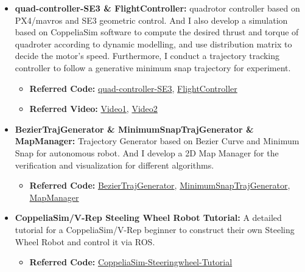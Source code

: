 \documentclass[11pt,a4paper,sans]{moderncv}        %
\begin{document}
\begin{CJK*}{UTF8}{gbsn}
{\begin{itemize}
\item \textbf{quad-controller-SE3 \& FlightController:} quadrotor controller based on PX4/mavros and SE3 geometric control. And I also develop a simulation based on CoppeliaSim software to compute the desired thrust and torque of quadroter according to dynamic modelling, and use distribution matrix to decide the motor's speed. Furthermore, I conduct a trajectory tracking controller to follow a generative minimum snap trajectory for experiment.

\begin{itemize}
\item \textbf{Referred Code:} \href{https://github.com/jianhengLiu/quad_controller_SE3}{quad-controller-SE3}, \href{https://github.com/jianhengLiu/FlightController}{FlightController}

\item \textbf{Referred Video:} \href{https://www.bilibili.com/video/BV1xv411w7Md?share_source=copy_web}{Video1}, \href{https://www.bilibili.com/video/BV1rq4y1N76T?share_source=copy_web}{Video2}
\end{itemize}

\vspace{6pt}

\item \textbf{BezierTrajGenerator \& MinimumSnapTrajGenerator \& 
MapManager:} Trajectory Generator based on Bezier Curve and Minimum Snap for autonomous robot. And I develop a 2D Map Manager for the verification and visualization for different algorithms.

\begin{itemize}
\item \textbf{Referred Code:} \href{https://github.com/jianhengLiu/BezierTrajGenerator}{BezierTrajGenerator}, \href{https://github.com/jianhengLiu/MinimumSnapTrajGenerator}{MinimumSnapTrajGenerator}, \href{https://github.com/jianhengLiu/MapManager}{MapManager}
\end{itemize}

\vspace{6pt}

\item \textbf{CoppeliaSim/V-Rep Steeling Wheel Robot Tutorial:} A detailed tutorial for a CoppeliaSim/V-Rep beginner to construct their own Steeling Wheel Robot and control it via ROS.

\begin{itemize}
\item \textbf{Referred Code:} \href{https://github.com/jianhengLiu/CoppeliaSim_Steeringwheel_Tutorial}{CoppeliaSim-Steeringwheel-Tutorial}
\end{itemize}
\vspace{6pt}


\end{itemize}}
\end{CJK*}
\end{document}
